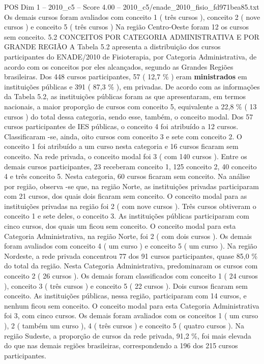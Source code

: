 \begin{textsample}{POS Dim 1 – 2010\_c5 – Score 4.00 – 2010\_c5/enade\_2010\_fisio\_fd971bea85.txt}
Os demais cursos foram avaliados com conceito 1 ( três cursos ), conceito 2 ( nove cursos ) e conceito 5 ( três cursos ) Na região Centro-Oeste foram 12 os cursos sem conceito. 5.2 CONCEITOS POR CATEGORIA ADMINISTRATIVA E POR GRANDE REGIÃO A Tabela 5.2 apresenta a distribuição dos cursos participantes do ENADE/2010 de Fisioterapia, por Categoria Administrativa, de acordo com os conceitos por eles alcançados, segundo as Grandes Regiões brasileiras.
Dos 448 cursos participantes, 57 ( 12,7 \% ) eram \textbf{ministrados} em instituições públicas e 391 ( 87,3 \% ), em privadas.
De acordo com as informações da Tabela 5.2, as instituições públicas foram as que apresentaram, em termos nacionais, a maior proporção de cursos com conceito 5, equivalente a 22,8 \% ( 13 cursos ) do total dessa categoria, sendo esse, também, o conceito modal.
Dos 57 cursos participantes de IES públicas, o conceito 4 foi atribuído a 12 cursos.
Classificaram -se, ainda, oito cursos com conceito 3 e sete com conceito 2.
O conceito 1 foi atribuído a um curso nesta categoria e 16 cursos ficaram sem conceito.
Na rede privada, o conceito modal foi 3 ( com 140 cursos ).
Entre os demais cursos participantes, 23 receberam conceito 1, 125 conceito 2, 40 conceito 4 e três conceito 5.
Nesta categoria, 60 cursos ficaram sem conceito.
Na análise por região, observa -se que, na região Norte, as instituições privadas participaram com 21 cursos, dos quais dois ficaram sem conceito.
O conceito modal para as instituições privadas na região foi 2 ( com nove cursos ).
Três cursos obtiveram o conceito 1 e sete deles, o conceito 3.
As instituições públicas participaram com cinco cursos, dos quais um ficou sem conceito.
O conceito modal para esta Categoria Administrativa, na região Norte, foi 2 ( com dois cursos ).
Os demais foram avaliados com conceito 4 ( um curso ) e conceito 5 ( um curso ).
Na região Nordeste, a rede privada concentrou 77 dos 91 cursos participantes, quase 85,0 \% do total da região.
Nesta Categoria Administrativa, predominaram os cursos com conceito 2 ( 26 cursos ).
Os demais foram classificados com conceito 1 ( 24 cursos ), conceito 3 ( três cursos ) e conceito 5 ( 22 cursos ).
Dois cursos ficaram sem conceito.
As instituições públicas, nessa região, participaram com 14 cursos, e nenhum ficou sem conceito.
O conceito modal para esta Categoria Administrativa foi 3, com cinco cursos.
Os demais foram avaliados com os conceitos 1 ( um curso ), 2 ( também um curso ), 4 ( três cursos ) e conceito 5 ( quatro cursos ).
Na região Sudeste, a proporção de cursos da rede privada, 91,2 \%, foi mais elevada do que nas demais regiões brasileiras, correspondendo a 196 dos 215 cursos participantes.

\end{textsample}
